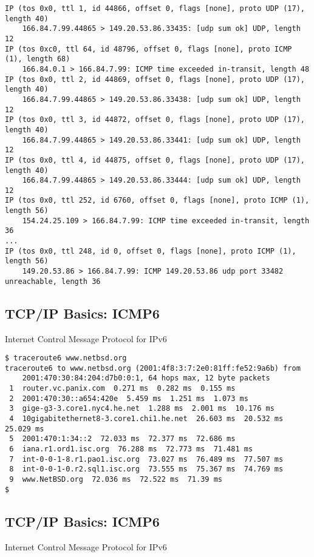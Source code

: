 \documentclass[xga]{xdvislides}
\begin{document}
\begin{verbatim}
IP (tos 0x0, ttl 1, id 44866, offset 0, flags [none], proto UDP (17), length 40)
    166.84.7.99.44865 > 149.20.53.86.33435: [udp sum ok] UDP, length 12
IP (tos 0xc0, ttl 64, id 48796, offset 0, flags [none], proto ICMP (1), length 68)
    166.84.0.1 > 166.84.7.99: ICMP time exceeded in-transit, length 48
IP (tos 0x0, ttl 2, id 44869, offset 0, flags [none], proto UDP (17), length 40)
    166.84.7.99.44865 > 149.20.53.86.33438: [udp sum ok] UDP, length 12
IP (tos 0x0, ttl 3, id 44872, offset 0, flags [none], proto UDP (17), length 40)
    166.84.7.99.44865 > 149.20.53.86.33441: [udp sum ok] UDP, length 12
IP (tos 0x0, ttl 4, id 44875, offset 0, flags [none], proto UDP (17), length 40)
    166.84.7.99.44865 > 149.20.53.86.33444: [udp sum ok] UDP, length 12
IP (tos 0x0, ttl 252, id 6760, offset 0, flags [none], proto ICMP (1), length 56)
    154.24.25.109 > 166.84.7.99: ICMP time exceeded in-transit, length 36
...
IP (tos 0x0, ttl 248, id 0, offset 0, flags [none], proto ICMP (1), length 56)
    149.20.53.86 > 166.84.7.99: ICMP 149.20.53.86 udp port 33482 unreachable, length 36
\end{verbatim}


\subsection{TCP/IP Basics: ICMP6}
\begin{center}
Internet Control Message Protocol for IPv6
\end{center}
\vspace{.2in}

\begin{verbatim}
$ traceroute6 www.netbsd.org
traceroute6 to www.netbsd.org (2001:4f8:3:7:2e0:81ff:fe52:9a6b) from
    2001:470:30:84:204:d7b0:0:1, 64 hops max, 12 byte packets
 1  router.vc.panix.com  0.271 ms  0.282 ms  0.155 ms
 2  2001:470:30::a654:420e  5.459 ms  1.251 ms  1.073 ms
 3  gige-g3-3.core1.nyc4.he.net  1.288 ms  2.001 ms  10.176 ms
 4  10gigabitethernet8-3.core1.chi1.he.net  26.603 ms  20.532 ms  25.029 ms
 5  2001:470:1:34::2  72.033 ms  72.377 ms  72.686 ms
 6  iana.r1.ord1.isc.org  76.288 ms  72.773 ms  71.481 ms
 7  int-0-0-1-8.r1.pao1.isc.org  73.027 ms  76.489 ms  77.507 ms
 8  int-0-0-1-0.r2.sql1.isc.org  73.555 ms  75.367 ms  74.769 ms
 9  www.NetBSD.org  72.036 ms  72.522 ms  71.39 ms
$
\end{verbatim}

\subsection{TCP/IP Basics: ICMP6}
\begin{center}
Internet Control Message Protocol for IPv6
\end{center}
\end{document}
